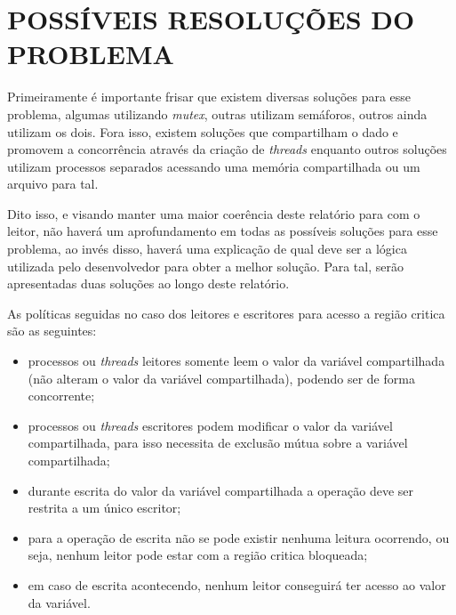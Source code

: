 \section{\normalsize POSSÍVEIS RESOLUÇÕES DO PROBLEMA}
	Primeiramente é importante frisar que existem diversas soluções para esse problema, algumas utilizando \textit{mutex}, outras utilizam semáforos, outros ainda utilizam os dois. Fora isso, existem soluções que compartilham o dado e promovem a concorrência através da criação de \textit{threads} enquanto outros soluções utilizam processos separados acessando uma memória compartilhada ou um arquivo para tal.
	
	Dito isso, e visando manter uma maior coerência deste relatório para com o leitor, não haverá um aprofundamento em todas as possíveis soluções para esse problema, ao invés disso, haverá uma explicação de qual deve ser a lógica utilizada pelo desenvolvedor para obter a melhor solução. Para tal, serão apresentadas duas soluções ao longo deste relatório.
	
	As políticas seguidas no caso dos leitores e escritores para acesso a região critica são as seguintes: 
	\begin{itemize}
		\item processos ou \textit{threads} leitores somente leem o valor da variável compartilhada (não alteram o valor da variável compartilhada), podendo ser de forma concorrente; 
		
		\item processos ou \textit{threads} escritores podem modificar o valor da variável compartilhada, para isso necessita de exclusão mútua sobre a variável compartilhada; 
		
		\item durante escrita do valor da variável compartilhada a operação deve ser restrita a um único escritor; 
		
		\item para a operação de escrita não se pode existir nenhuma leitura ocorrendo, ou seja, nenhum leitor pode estar com a região critica bloqueada; 
		
		\item em caso de escrita acontecendo, nenhum leitor conseguirá ter acesso ao valor da variável.

	\end{itemize}		
	
